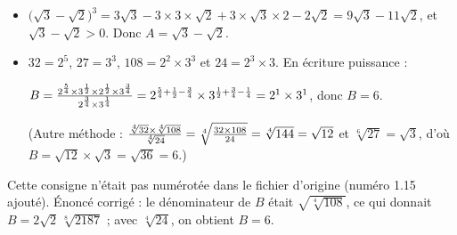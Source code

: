 \collerici
\begin{corrigeprof}[10]
\begin{itemize}
	\item $\big(\sqrt3-\sqrt2\big)^3=3\sqrt3-3\times3\times\sqrt2+3\times\sqrt3\times2-2\sqrt2=9\sqrt3-11\sqrt2$, et $\sqrt3-\sqrt2>0$. Donc $A=\sqrt3-\sqrt2$.
	\item $32=2^5$, $27=3^3$, $108=2^2\times3^3$ et $24=2^3\times 3$. En écriture puissance :
	\par $B=\frac{2^{\frac{5}{4}}\times 3^{\frac{1}{2}}\times 2^{\frac{1}{2}}\times 3^{\frac{3}{4}}}{2^{\frac{3}{4}}\times 3^{\frac{1}{4}}}=2^{\frac{5}{4}+\frac{1}{2}-\frac{3}{4}}\times3^{\frac{1}{2}+\frac{3}{4}-\frac{1}{4}}=2^1\times 3^1$, donc $B=6$.
	\par (Autre méthode : $\frac{\sqrt[4]{32}\times\sqrt[4]{108}}{\sqrt[4]{24}}=\sqrt[4]{\frac{32\times108}{24}}=\sqrt[4]{144}=\sqrt{12}$ et $\sqrt[6]{27}=\sqrt3$, d'où $B=\sqrt{12}\times\sqrt3=\sqrt{36}=6$.)
\end{itemize}
\end{corrigeprof}
\begin{noteprof}
Cette consigne n'était pas numérotée dans le fichier d'origine (numéro 1.15 ajouté). Énoncé corrigé : le dénominateur de $B$ était $\sqrt{\sqrt[4]{108}}$, ce qui donnait $B=2\sqrt2\,\sqrt[8]{2187}$ ; avec $\sqrt[4]{24}$, on obtient $B=6$.
\end{noteprof}
\ifenseignant %
